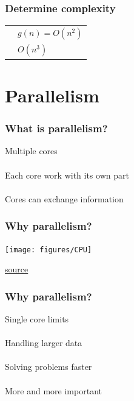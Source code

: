 \documentclass{beamer}
\begin{document}
\begin{frame}
	\frametitle{Determine complexity}
	\begin{centering}
		\begin{tabular}{p{4.5cm} p{4.5cm}}
			& $g(n) = O(n^2)$ \\
			\usebox{\listboxV} & $O(n^3)$ \\
		\end{tabular} 
	\end{centering} 
\end{frame}

\section{Parallelism}

\begin{frame}
	\frametitle{What is parallelism?}
	\begin{center}
		Multiple cores \\~\\
		
		Each core work with its own part \\~\\
		
		Cores can exchange information
	\end{center}
\end{frame}

\begin{frame}
	\frametitle{Why parallelism?}
	\begin{table}[t]
		\begin{center}
			\texttt{[image: figures/CPU]}
		\end{center}
	\end{table}
	\href{http://www.gotw.ca/publications/concurrency-ddj.htm}{source}
\end{frame}

\begin{frame}
	\frametitle{Why parallelism?}
	\begin{center}
		Single core limits \\~\\
		
		Handling larger data \\~\\
		
		Solving problems faster \\~\\
		
		More and more important
	\end{center}
\end{frame}
\end{document}

